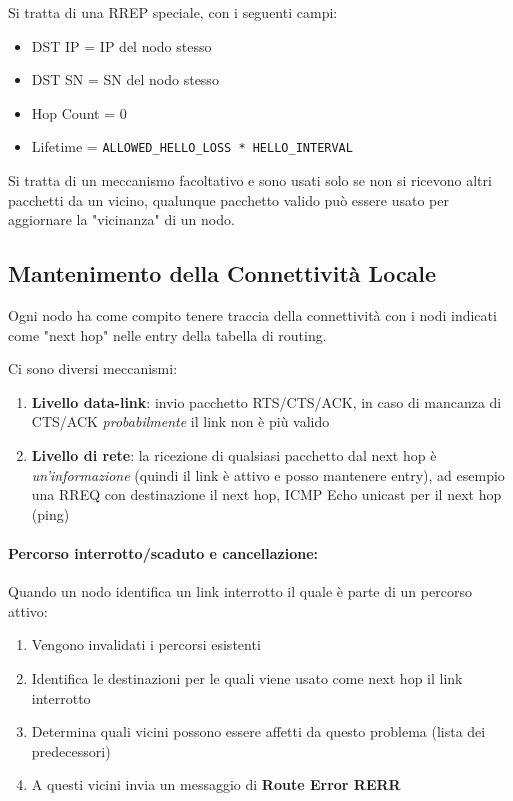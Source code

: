 Si tratta di una RREP speciale, con i seguenti campi: 
\begin{itemize}
	\item DST IP = IP del nodo stesso

	\item DST SN = SN del nodo stesso

	\item Hop Count = 0

	\item Lifetime = \texttt{ALLOWED\_HELLO\_LOSS * HELLO\_INTERVAL}
\end{itemize}

Si tratta di un meccanismo facoltativo e sono usati solo se non si ricevono altri pacchetti da un vicino, qualunque pacchetto valido può essere usato per aggiornare la "vicinanza" di un nodo.

\subsection{Mantenimento della Connettività Locale}

Ogni nodo ha come compito tenere traccia della connettività con i nodi indicati come "next hop" nelle entry della tabella di routing.

Ci sono diversi meccanismi:
\begin{enumerate}
	\item \textbf{Livello data-link}: invio pacchetto RTS/CTS/ACK, in caso di mancanza di CTS/ACK \textit{probabilmente} il link non è più valido
	
    \item \textbf{Livello di rete}: la ricezione di qualsiasi pacchetto dal next hop è \textit{un'informazione} (quindi il link è attivo e posso mantenere entry), ad esempio una RREQ con destinazione il next hop, ICMP Echo unicast per il next hop (ping)
\end{enumerate}

\paragraph{Percorso interrotto/scaduto e cancellazione:} Quando un nodo identifica un link interrotto il quale è parte di un percorso attivo:
\begin{enumerate}
	\item Vengono invalidati i percorsi esistenti
	
    \item Identifica le destinazioni per le quali viene usato come next hop il link interrotto
	
    \item Determina quali vicini possono essere affetti da questo problema (lista dei predecessori)
	
    \item A questi vicini invia un messaggio di \textbf{Route Error RERR}
\end{enumerate} 

